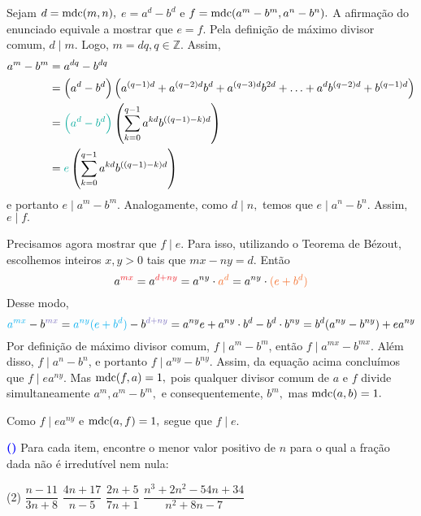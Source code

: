 \documentclass[12pt, a4paper]{article}
\newcommand{\mdc}{{\rm mdc}}
\newcommand{\negrito}[1]{\mbox{\boldmath{$#1$}}}
\newcounter{exercicio}[section]
\newenvironment{exercicio}[1][]{\refstepcounter{exercicio}\par\medskip
 \textcolor{blue}{\bf(\theexercicio)} \rmfamily}{\medskip }
\newcommand{\itensladoalado}[2]{\begin{tasks}[label={(tsk[a])},label-width=3.6ex, label-format = {\bfseries}, column-sep = {0pt}](#1) #2 \end{tasks}}
\newcommand{\alt}[1]{\textcolor{Floresta}{$\negrito{(#1)} $}}
\begin{document}
\begin{solution}
Sejam $d = \mdc(m,n), $ $e = a^d - b^d$ e  $f =\mdc(a^m - b^m,a^n - b^n).$ A afirmação do enunciado equivale a mostrar que $e = f.$
Pela definição de máximo divisor comum, $d \mid m.$ Logo, $m = dq, q \in \mathbb{Z}.$ Assim, 
\begin{align*}
a^m - b^m &= a^{dq} - b^{dq} \\&=\left(a^d - b^d\right)\left(a^{(q-1)d} + a^{(q-2)d}b^d + a^{(q-3)d}b^{2d} + \ldots + a^{d}b^{ (q-2)d} + b^{(q-1)d}\right) \\&= \textcolor{JungleGreen}{\left(a^d - b^d\right)}\left(\sum\limits_{k=0}^{q-1} a^{kd}b^{((q-1)-k)d} \right) \\&= \textcolor{JungleGreen}{e}\left(\sum\limits_{k=0}^{q-1} a^{kd}b^{((q-1)-k)d} \right) 
\end{align*}
e portanto $e \mid a^m - b^m.$ Analogamente, como $d \mid n,$ temos que $e \mid a^n - b^n.$ Assim, $e \mid f.$ 

Precisamos agora mostrar que $f \mid e.$ Para isso, utilizando o Teorema de Bézout, escolhemos inteiros $x,y > 0$ tais que $mx - ny = d.$ Então
\[
a^{\textcolor{Red}{mx}} = a^{\textcolor{Red}{d + ny}} = a^{ny} \cdot \textcolor{Orange}{a^d} = a^{ny} \cdot \textcolor{Orange}{(e + b^d)} 
\]
Desse modo,
\[
\textcolor{Cyan}{a^{mx}} - b^{\textcolor{Periwinkle}{mx}} = \textcolor{Cyan}{a^{ny}(e + b^d)} - b^{\textcolor{Periwinkle}{d + ny}} = a^{ny}e + a^{ny} \cdot b^d - b^d \cdot b^{ny} = b^d(a^{ny} - b^{ny}) + ea^{ny}
\]
Por definição de máximo divisor comum, $f \mid a^m - b^m$, então $f \mid a^{mx} - b^{mx}.$ Além disso, $f \mid a^n - b^n$, e portanto $f \mid a^{ny} - b^{ny}.$ Assim, da equação acima concluímos que $f \mid ea^{ny}.$ Mas $\mdc(f,a) = 1,$ pois qualquer divisor comum de $a$ e $f$ divide simultaneamente $a^m, a^m - b^m,$ e consequentemente, $b^m,$ mas $\mdc(a,b) = 1.$ 

Como $f \mid ea^{ny}$ e $\mdc(a,f) = 1,$ segue que $f \mid e.$
\end{solution}
\begin{exercicio}
Para cada item, encontre o menor valor positivo de $n$ para o qual a fração dada não é irredutível nem nula:
\itensladoalado{2}{
\task[\alt{a}] $\dfrac{n -11}{3n+8}$
\task[\alt{b}] $\dfrac{4n+17}{n-5}$
\task[\alt{c}] $\dfrac{2n + 5}{7n+1}$
\task[\alt{d}] $\dfrac{n^3+2n^2-54n+34}{n^2 + 8n - 7}$
}
\end{exercicio}
\end{document}
